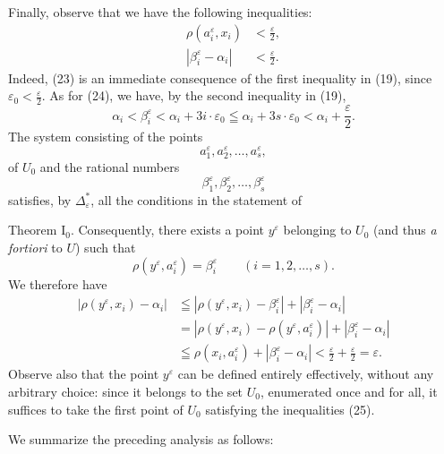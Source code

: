 \documentclass[a4paper,12pt]{amsart}
\newcommand{\srcpage}[1]{} %
\begin{document}
Finally, observe that we have the following inequalities:
\begin{align}
\rho(a_i^\varepsilon,x_i)&<\frac{\varepsilon}{2},\tag{23}\\
|\beta_i^\varepsilon-\alpha_i|&<\frac{\varepsilon}{2}.\tag{24}
\end{align}
Indeed, (23) is an immediate consequence of the first inequality in (19), since $\varepsilon_0<\frac{\varepsilon}{2}$. As for (24), we have, by the second inequality in (19),
\[
\alpha_i<\beta_i^\varepsilon<\alpha_i+3i\cdot\varepsilon_0
\leqq\alpha_i+3s\cdot\varepsilon_0<\alpha_i+\frac{\varepsilon}{2}.
\]
The system consisting of the points
\[
a_1^\varepsilon,a_2^\varepsilon,\dots,a_s^\varepsilon,
\]
of $U_0$ and the rational numbers
\[
\beta_1^\varepsilon,\beta_2^\varepsilon,\dots,\beta_s^\varepsilon
\]
satisfies, by $\Delta^*_\varepsilon$, all the conditions in the statement of
\srcpage{61}
Theorem I$_0$. Consequently, there exists a point $y^\varepsilon$ belonging to $U_0$ (and thus \textit{a fortiori} to $U$) such that
\begin{equation}\tag{25}
\rho(y^\varepsilon,a_i^\varepsilon)=\beta_i^\varepsilon\qquad(i=1,2,\dots,s).
\end{equation}
We therefore have
\[
\begin{aligned}
|\rho(y^\varepsilon,x_i)-\alpha_i|
&\leqq|\rho(y^\varepsilon,x_i)-\beta_i^\varepsilon|+|\beta_i^\varepsilon-\alpha_i|\\
&=|\rho(y^\varepsilon,x_i)-\rho(y^\varepsilon,a_i^\varepsilon)|+|\beta_i^\varepsilon-\alpha_i|\\
&\leqq\rho(x_i,a_i^\varepsilon)+|\beta_i^\varepsilon-\alpha_i|
<\frac{\varepsilon}{2}+\frac{\varepsilon}{2}=\varepsilon.
\end{aligned}
\]
Observe also that the point $y^\varepsilon$ can be defined entirely effectively, without any arbitrary choice: since it belongs to the set $U_0$, enumerated once and for all, it suffices to take the first point of $U_0$ satisfying the inequalities (25).

We summarize the preceding analysis as follows:
\end{document}
